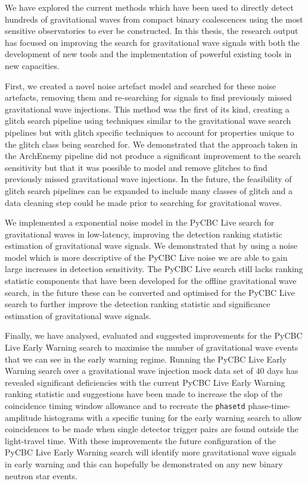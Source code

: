 We have explored the current methods which have been used to directly detect hundreds of gravitational waves from compact binary coalescences using the most sensitive observatories to ever be constructed. In this thesis, the research output has focused on improving the search for gravitational wave signals with both the development of new tools and the implementation of powerful existing tools in new capacities.

First, we created a novel \scladj noise artefact model and searched for these noise artefacts, removing them and re-searching for signals to find previously missed gravitational wave injections. This method was the first of its kind, creating a glitch search pipeline using techniques similar to the gravitational wave search pipelines but with glitch specific techniques to account for properties unique to the glitch class being searched for. We demonstrated that the approach taken in the ArchEnemy pipeline did not produce a significant improvement to the search sensitivity but that it was possible to model and remove glitches to find previously missed gravitational wave injections. In the future, the feasibility of glitch search pipelines can be expanded to include many classes of glitch and a data cleaning step could be made prior to searching for gravitational waves.

We implemented a exponential noise model in the PyCBC Live search for gravitational waves in low-latency, improving the detection ranking statistic estimation of gravitational wave signals. We demonstrated that by using a noise model which is more descriptive of the PyCBC Live noise we are able to gain large increases in detection sensitivity. The PyCBC Live search still lacks ranking statistic components that have been developed for the offline gravitational wave search, in the future these can be converted and optimised for the PyCBC Live search to further improve the detection ranking statistic and significance estimation of gravitational wave signals.

Finally, we have analysed, evaluated and suggested improvements for the PyCBC Live Early Warning search to maximise the number of gravitational wave events that we can see in the early warning regime. Running the PyCBC Live Early Warning search over a gravitational wave injection mock data set of $40$ days has revealed significant deficiencies with the current PyCBC Live Early Warning ranking statistic and suggestions have been made to increase the slop of the coincidence timing window allowance and to recreate the \verb|phasetd| phase-time-amplitude histograms with a specific tuning for the early warning search to allow coincidences to be made when single detector trigger pairs are found outside the light-travel time. With these improvements the future configuration of the PyCBC Live Early Warning search will identify more gravitational wave signals in early warning and this can hopefully be demonstrated on any new binary neutron star events.

